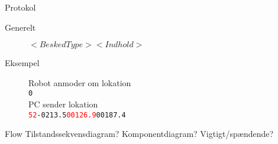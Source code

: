 \begin{frame}{Protokol}
\begin{description}
\item[Generelt]{$< BeskedType >< Indhold >$}
\item[Eksempel]{Robot anmoder om lokation\\
\texttt{0}\\
PC sender lokation\\
\texttt{\textcolor{red}{52}-0213.5\textcolor{red}{00126.9}00187.4}}
\end{description}
\end{frame}

\begin{frame}{Flow}
Tilstandssekvensdiagram? Komponentdiagram? Vigtigt/spændende?
\end{frame}
